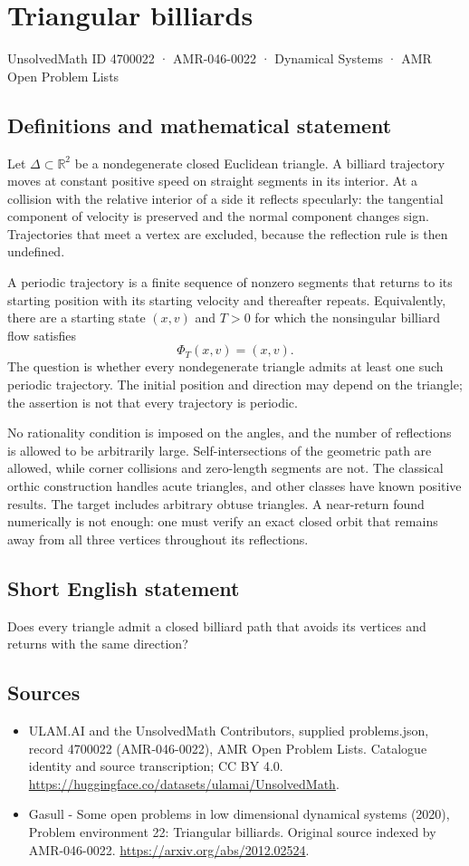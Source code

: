 \documentclass[11pt,a4paper]{article}
\begin{document}
\section*{Triangular billiards}\label{4700022}
{\small UnsolvedMath ID 4700022 · AMR-046-0022 · Dynamical Systems · AMR Open Problem Lists}
\subsection{Definitions and mathematical statement}
Let $\Delta\subset\mathbb R^2$ be a nondegenerate closed Euclidean triangle.
A billiard trajectory moves at constant positive speed on straight
segments in its interior. At a collision with the relative interior of a
side it reflects specularly: the tangential component of velocity is
preserved and the normal component changes sign. Trajectories that meet
a vertex are excluded, because the reflection rule is then undefined.

A periodic trajectory is a finite sequence of nonzero segments that
returns to its starting position with its starting velocity and thereafter
repeats. Equivalently, there are a starting state $(x,v)$ and $T>0$ for
which the nonsingular billiard flow satisfies
\[
 \Phi_T(x,v)=(x,v).
\]
The question is whether every nondegenerate triangle admits at least one
such periodic trajectory. The initial position and direction may depend
on the triangle; the assertion is not that every trajectory is periodic.

No rationality condition is imposed on the angles, and the number of
reflections is allowed to be arbitrarily large. Self-intersections of the
geometric path are allowed, while corner collisions and zero-length
segments are not. The classical orthic construction handles acute
triangles, and other classes have known positive results. The target
includes arbitrary obtuse triangles. A near-return found numerically is
not enough: one must verify an exact closed orbit that remains away from
all three vertices throughout its reflections.
\subsection{Short English statement}
Does every triangle admit a closed billiard path that avoids its vertices and returns with the same direction?
\subsection{Sources}
\begin{itemize}
\item[S1] ULAM.AI and the UnsolvedMath Contributors, supplied problems.json, record 4700022 (AMR-046-0022), AMR Open Problem Lists. Catalogue identity and source transcription; CC BY 4.0.
\url{https://huggingface.co/datasets/ulamai/UnsolvedMath}.
\item[S2] Gasull - Some open problems in low dimensional dynamical systems (2020), Problem environment 22: Triangular billiards. Original source indexed by AMR-046-0022.
\url{https://arxiv.org/abs/2012.02524}.
\end{itemize}
\end{document}
